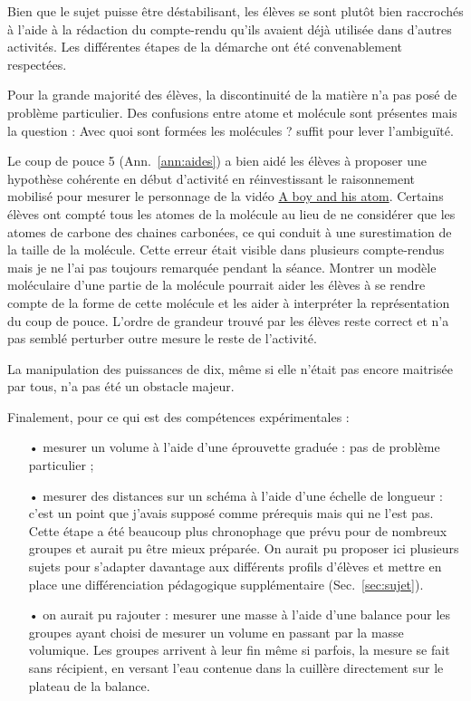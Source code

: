 \documentclass[12pt,a4paper, fleqn]{article}
\begin{document}
Bien que le sujet puisse être déstabilisant, les élèves se sont plutôt bien raccrochés à l'aide à la rédaction du compte-rendu qu'ils avaient déjà utilisée dans d'autres activités.
Les différentes étapes de la démarche ont été convenablement respectées.

Pour la grande majorité des élèves, la discontinuité de la matière n'a pas posé de problème particulier.
Des confusions entre atome et molécule sont présentes mais la question : \og Avec quoi sont formées les molécules ? \fg{} suffit pour lever l'ambiguïté.

Le coup de pouce 5 (Ann.~\ref{ann:aides}) a bien aidé les élèves à proposer une hypothèse cohérente en début d'activité en réinvestissant le raisonnement mobilisé pour mesurer le personnage de la vidéo \href{https://youtu.be/oSCX78-8-q0}{A boy and his atom}.
Certains élèves ont compté tous les atomes de la molécule au lieu de ne considérer que les atomes de carbone des chaines carbonées, ce qui conduit à une surestimation de la taille de la molécule.
Cette \og erreur \fg{} était visible dans plusieurs compte-rendus mais je ne l'ai pas toujours remarquée pendant la séance.
Montrer un modèle moléculaire d'une partie de la molécule pourrait aider les élèves à se rendre compte de la forme de cette molécule et les aider à interpréter la représentation du coup de pouce.
L'ordre de grandeur trouvé par les élèves reste correct et n'a pas semblé perturber outre mesure le reste de l'activité.

La manipulation des puissances de dix, même si elle n'était pas encore maitrisée par tous, n'a pas été un obstacle majeur.

Finalement, pour ce qui est des compétences expérimentales :
\begin{itemize}
\item[•] mesurer un volume à l'aide d'une éprouvette graduée : pas de problème particulier ;
\item[•] mesurer des distances sur un schéma à l'aide d'une échelle de longueur : c'est un point que j'avais supposé comme prérequis mais qui ne l'est pas.
Cette étape a été beaucoup plus chronophage que prévu pour de nombreux groupes et aurait pu être mieux préparée.
On aurait pu proposer ici plusieurs sujets pour s'adapter davantage aux différents profils d'élèves et mettre en place une différenciation pédagogique supplémentaire (Sec.~\ref{sec:sujet}).
\item[•] on aurait pu rajouter : mesurer une masse à l'aide d'une balance pour les groupes ayant choisi de mesurer un volume en passant par la masse volumique.
Les groupes arrivent à leur fin même si parfois, la mesure se fait sans récipient, en versant l'eau contenue dans la cuillère directement sur le plateau de la balance.
\end{itemize}
\end{document}

